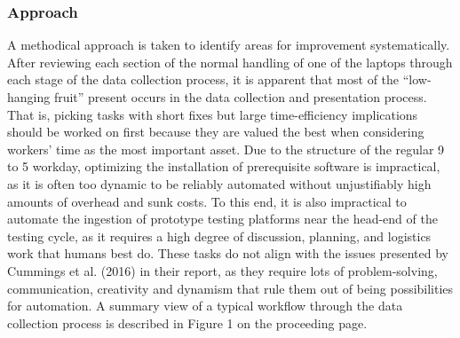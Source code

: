 \documentclass[12pt]{article}
\begin{document}
\subsubsection{Approach}
\indent\hspace{0.5in} A methodical approach is taken to identify areas for improvement systematically. After reviewing each section of the normal handling of one of the laptops through each stage of the data collection process, it is apparent that most of the “low-hanging fruit” present occurs in the data collection and presentation process. That is, picking tasks with short fixes but large time-efficiency implications should be worked on first because they are valued the best when considering workers' time as the most important asset. Due to the structure of the regular 9 to 5 workday, optimizing the installation of prerequisite software is impractical, as it is often too dynamic to be reliably automated without unjustifiably high amounts of overhead and sunk costs. To this end, it is also impractical to automate the ingestion of prototype testing platforms near the head-end of the testing cycle, as it requires a high degree of discussion, planning, and logistics work that humans best do. These tasks do not align with the issues presented by Cummings et al. (2016) in their report, as they require lots of problem-solving, communication, creativity and dynamism that rule them out of being possibilities for automation. A summary view of a typical workflow through the data collection process is described in Figure 1 on the proceeding page.
\newpage
\end{document}

